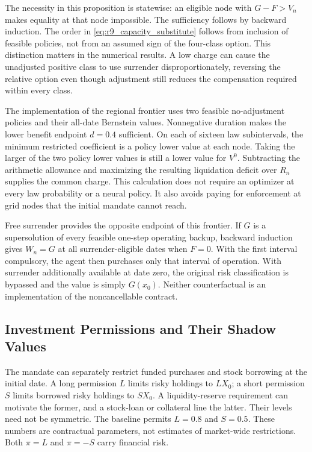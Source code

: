 The necessity in this proposition is statewise: an eligible node with $G-F>V_n$ makes equality at that node impossible. The sufficiency follows by backward induction. The order in \eqref{eq:r9_capacity_substitute} follows from inclusion of feasible policies, not from an assumed sign of the four-class option. This distinction matters in the numerical results. A low charge can cause the unadjusted positive class to use surrender disproportionately, reversing the relative option even though adjustment still reduces the compensation required within every class.

The implementation of the regional frontier uses two feasible no-adjustment policies and their all-date Bernstein values. Nonnegative duration makes the lower benefit endpoint $d=0.4$ sufficient. On each of sixteen law subintervals, the minimum restricted coefficient is a policy lower value at each node. Taking the larger of the two policy lower values is still a lower value for $V^0$. Subtracting the arithmetic allowance and maximizing the resulting liquidation deficit over $R_n$ supplies the common charge. This calculation does not require an optimizer at every law probability or a neural policy. It also avoids paying for enforcement at grid nodes that the initial mandate cannot reach.

Free surrender provides the opposite endpoint of this frontier. If $G$ is a supersolution of every feasible one-step operating backup, backward induction gives $W_n=G$ at all surrender-eligible dates when $F=0$. With the first interval compulsory, the agent then purchases only that interval of operation. With surrender additionally available at date zero, the original risk classification is bypassed and the value is simply $G(x_0)$. Neither counterfactual is an implementation of the noncancellable contract.

\subsection{Investment Permissions and Their Shadow Values}
\label{subsec:r9_permissions}
The mandate can separately restrict funded purchases and stock borrowing at the initial date. A long permission $L$ limits risky holdings to $L X_0$; a short permission $S$ limits borrowed risky holdings to $S X_0$. A liquidity-reserve requirement can motivate the former, and a stock-loan or collateral line the latter. Their levels need not be symmetric. The baseline permits $L=0.8$ and $S=0.5$. These numbers are contractual parameters, not estimates of market-wide restrictions. Both $\pi=L$ and $\pi=-S$ carry financial risk.


